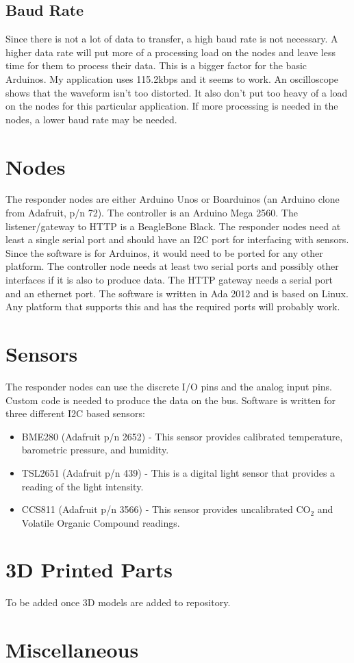 \documentclass[10pt, openany, draft]{article}
\begin{document}
\subsection{Baud Rate}
Since there is not a lot of data to transfer, a high baud rate is not necessary.  A higher data rate will put more of a processing load on the nodes and leave less time for them to process their data.  This is a bigger factor for the basic Arduinos.  My application uses 115.2kbps and it seems to work.  An oscilloscope shows that the waveform isn't too distorted.  It also don't put too heavy of a load on the nodes for this particular application.  If more processing is needed in the nodes, a lower baud rate may be needed.

\section{Nodes}
The responder nodes are either Arduino Unos or Boarduinos (an Arduino clone from Adafruit, p/n 72).  The controller is an Arduino Mega 2560.  The listener/gateway to HTTP is a BeagleBone Black.  The responder nodes need at least a single serial port and should have an I2C port for interfacing with sensors.  Since the software is for Arduinos, it would need to be ported for any other platform.  The controller node needs at least two serial ports and possibly other interfaces if it is also to produce data.  The HTTP gateway needs a serial port and an ethernet port.  The software is written in Ada 2012 and is based on Linux.  Any platform that supports this and has the required ports will probably work.

\section{Sensors}
The responder nodes can use the discrete I/O pins and the analog input pins.  Custom code is needed to produce the data on the bus.  Software is written for three different I2C based sensors:

\begin{itemize}
  \item BME280 (Adafruit p/n 2652) - This sensor provides calibrated temperature, barometric pressure, and humidity.
  \item TSL2651 (Adafruit p/n 439) - This is a digital light sensor that provides a reading of the light intensity.
  \item CCS811 (Adafruit p/n 3566) - This sensor provides uncalibrated CO$_2$ and Volatile Organic Compound readings.
\end{itemize}

\section{3D Printed Parts}
To be added once 3D models are added to repository.

\section{Miscellaneous}
\end{document}
